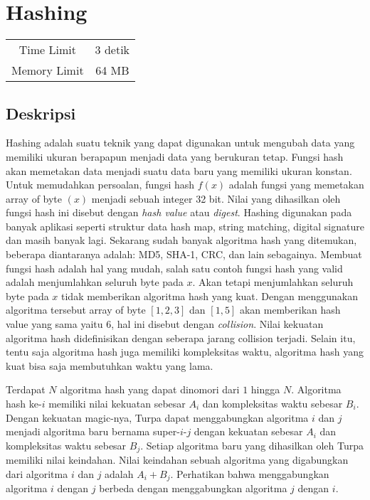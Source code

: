 \documentclass{article}
\begin{document}
\section*{\hfil Hashing\hfil}

\begin{center}
\begin{tabular}{ |cc| } 
 \hline
 Time Limit & 3 detik \\ 
 Memory Limit & 64 MB \\
 \hline
\end{tabular}
\end{center}

\subsection*{Deskripsi}

\par Hashing adalah suatu teknik yang dapat digunakan untuk mengubah data yang memiliki ukuran berapapun menjadi data yang berukuran tetap. Fungsi hash akan memetakan data menjadi suatu data baru yang memiliki ukuran konstan. Untuk memudahkan persoalan, fungsi hash $f(x)$ adalah fungsi yang memetakan array of byte $(x)$ menjadi sebuah integer 32 bit. Nilai yang dihasilkan oleh fungsi hash ini disebut dengan \textit{hash value} atau \textit{digest}. Hashing digunakan pada banyak aplikasi seperti struktur data hash map, string matching, digital signature dan masih banyak lagi. Sekarang sudah banyak algoritma hash yang ditemukan, beberapa diantaranya adalah: MD5, SHA-1, CRC, dan lain sebagainya. Membuat fungsi hash adalah hal yang mudah, salah satu contoh fungsi hash yang valid adalah menjumlahkan seluruh byte pada $x$. Akan tetapi menjumlahkan seluruh byte pada $x$ tidak memberikan algoritma hash yang kuat. Dengan menggunakan algoritma tersebut array of byte $[1,2,3]$ dan $[1,5]$ akan memberikan hash value yang sama yaitu $6$, hal ini disebut dengan \textit{collision}. Nilai kekuatan algoritma hash didefinisikan dengan seberapa jarang collision terjadi. Selain itu, tentu saja algoritma hash juga memiliki kompleksitas waktu, algoritma hash yang kuat bisa saja membutuhkan waktu yang lama.

\par Terdapat $N$ algoritma hash yang dapat dinomori dari $1$ hingga $N$. Algoritma hash ke-$i$ memiliki nilai kekuatan sebesar $A_i$ dan kompleksitas waktu sebesar $B_i$. Dengan kekuatan magic-nya, Turpa dapat menggabungkan algoritma $i$ dan $j$ menjadi algoritma baru bernama super-$i$-$j$ dengan kekuatan sebesar $A_i$ dan kompleksitas waktu sebesar $B_j$. Setiap algoritma baru yang dihasilkan oleh Turpa memiliki nilai keindahan. Nilai keindahan sebuah algoritma yang digabungkan dari algoritma $i$ dan $j$ adalah $A_i + B_j$. Perhatikan bahwa menggabungkan algoritma $i$ dengan $j$ berbeda dengan menggabungkan algoritma $j$ dengan $i$.
\end{document}
